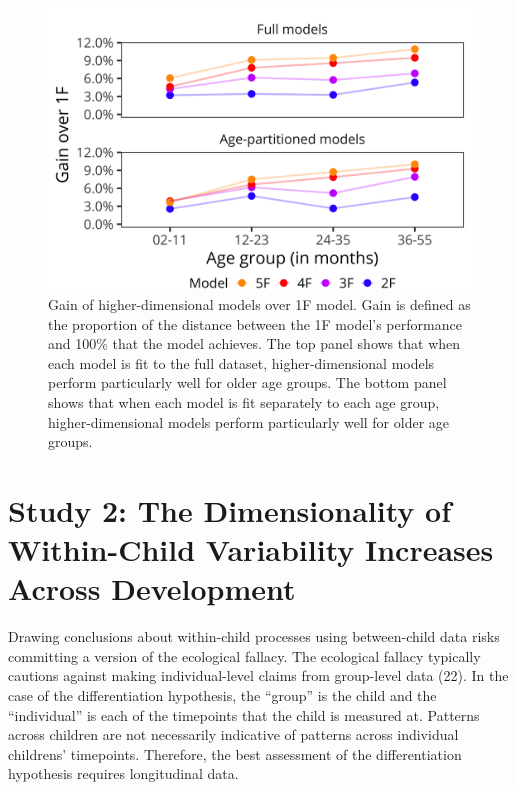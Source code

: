 \documentclass[man]{apa7}
\begin{document}
\begin{figure}
\centering
\includegraphics[width=1\columnwidth]{figures/study1.png}
\caption{Gain of higher-dimensional models over 1F model. Gain is defined as the proportion of the distance between the 1F model’s performance and 100\% that the model achieves. The top panel shows that when each model is fit to the full dataset, higher-dimensional models perform particularly well for older age groups. The bottom panel shows that when each model is fit separately to each age group, higher-dimensional models perform particularly well for older age groups.}
\label{fig:study1}
\end{figure}

\hypertarget{study-2-the-dimensionality-of-within-child-variability-increases-across-development}{%
\section*{Study 2: The Dimensionality of Within-Child Variability
Increases Across
Development}\label{study-2-the-dimensionality-of-within-child-variability-increases-across-development}}

Drawing conclusions about within-child processes using between-child
data risks committing a version of the ecological fallacy. The
ecological fallacy typically cautions against making individual-level
claims from group-level data (22). In the case of the differentiation
hypothesis, the ``group'' is the child and the ``individual'' is each of
the timepoints that the child is measured at. Patterns across children
are not necessarily indicative of patterns across individual childrens'
timepoints. Therefore, the best assessment of the differentiation
hypothesis requires longitudinal data.
\end{document}
